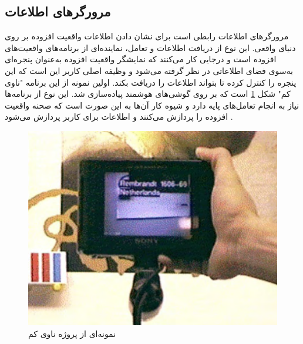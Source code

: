 \subsection{مرورگرهای اطلاعات}
مرورگرهای اطلاعات رابطی است برای نشان دادن اطلاعات واقعیت افزوده بر روی دنیای واقعی. این نوع از دریافت اطلاعات و تعامل، نماینده‌ای از برنامه‌های واقعیت‌های افزوده است و درجایی کار می‌کنند که نمایشگر واقعیت افزوده به‌عنوان پنجره‌ای به‌سوی فضای اطلاعاتی در نظر گرفته می‌شود و وظیفه اصلی کاربر این است که این پنجره را کنترل کرده تا بتواند اطلاعات را دریافت بکند. اولین نمونه از این برنامه "ناوی کم" شکل \ref{fig:navicam} است که بر روی گوشی‌های هوشمند پیاده‌سازی شد. این نوع از برنامه‌ها نیاز به انجام تعامل‌های پایه دارد و شیوه کار آن‌ها به این صورت است که صحنه واقعیت افزوده را پردازش می‌کنند و اطلاعات برای کاربر پردازش می‌شود \cite{Rekimoto}.
\begin{figure}[tb]
	\centering
	\includegraphics[width=0.6\linewidth]{image/navicam}
	\caption {نمونه‌ای از پروژه ناوی کم\cite{Rekimoto}}
	\label{fig:navicam}
\end{figure}
